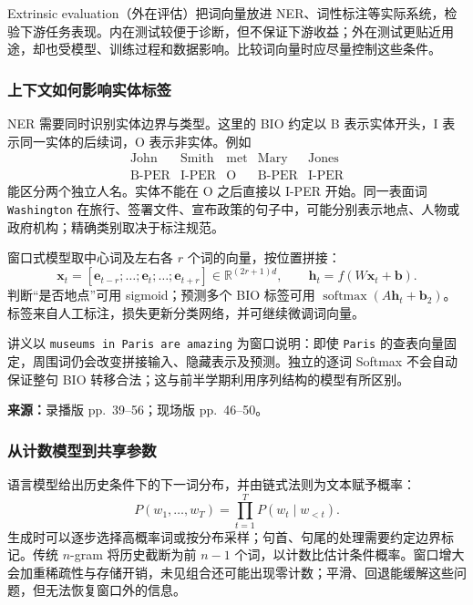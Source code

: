 Extrinsic evaluation（外在评估）把词向量放进 NER、词性标注等实际系统，检验下游任务表现。内在测试较便于诊断，但不保证下游收益；外在测试更贴近用途，却也受模型、训练过程和数据影响。比较词向量时应尽量控制这些条件。

\subsubsection{上下文如何影响实体标签}

NER 需要同时识别实体边界与类型。这里的 BIO 约定以 B 表示实体开头，I 表示同一实体的后续词，O 表示非实体。例如
\[
\begin{array}{ccccc}
 \text{John}&\text{Smith}&\text{met}&\text{Mary}&\text{Jones}\\
 \text{B-PER}&\text{I-PER}&\text{O}&\text{B-PER}&\text{I-PER}
\end{array}
\]
能区分两个独立人名。实体不能在 O 之后直接以 I-PER 开始。同一表面词 \texttt{Washington} 在旅行、签署文件、宣布政策的句子中，可能分别表示地点、人物或政府机构；精确类别取决于标注规范。

窗口式模型取中心词及左右各 $r$ 个词的向量，按位置拼接：
\[
  \mathbf x_t=[\mathbf e_{t-r};\ldots;\mathbf e_t;\ldots;\mathbf e_{t+r}]
   \in\mathbb R^{(2r+1)d},\qquad
  \mathbf h_t=f(W\mathbf x_t+\mathbf b).
\]
判断“是否地点”可用 sigmoid；预测多个 BIO 标签可用 $\operatorname{softmax}(A\mathbf h_t+\mathbf b_2)$。标签来自人工标注，损失更新分类网络，并可继续微调词向量。

讲义以 \texttt{museums in Paris are amazing} 为窗口说明：即使 \texttt{Paris} 的查表向量固定，周围词仍会改变拼接输入、隐藏表示及预测。独立的逐词 Softmax 不会自动保证整句 BIO 转移合法；这与前半学期利用序列结构的模型有所区别。

\nopagebreak[4]

\textbf{来源：}录播版 pp.~39--56；现场版 pp.~46--50。
\nopagebreak[4]

\subsubsection{从计数模型到共享参数}

语言模型给出历史条件下的下一词分布，并由链式法则为文本赋予概率：
\[
  P(w_1,\ldots,w_T)=\prod_{t=1}^{T}P(w_t\mid w_{<t}).
\]
生成时可以逐步选择高概率词或按分布采样；句首、句尾的处理需要约定边界标记。传统 $n$-gram 将历史截断为前 $n-1$ 个词，以计数比估计条件概率。窗口增大会加重稀疏性与存储开销，未见组合还可能出现零计数；平滑、回退能缓解这些问题，但无法恢复窗口外的信息。

